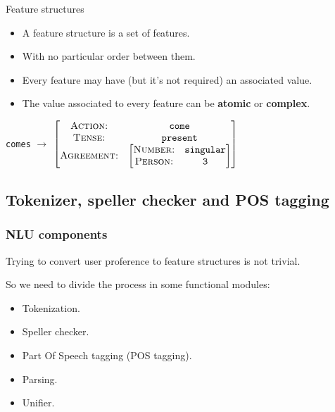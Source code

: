 \documentclass[11pt]{beamer}
\begin{document}
\begin{frame}
	\begin{block}{Feature structures}
	\begin{itemize}
		\item A feature structure is a set of features.
		\item With no particular order between them.
		\item Every feature may have (but it's not required) an associated value.
		\item The value associated to every feature can be \textbf{atomic} or \textbf{complex}.
	\end{itemize}
	\end{block}
	\vspace{10pt}
	\pause
	\begin{center}
		\texttt{comes} \small $\longrightarrow$ 
				$\begin{bmatrix}
						\textsc{Action:}      & \texttt{come}\\ 
						\textsc{Tense:}     	& \texttt{present}\\ 
						\textsc{Agreement:}   & \begin{bmatrix}
																			\textsc{Number:} & \texttt{singular}\\ 
																			\textsc{Person:} & \texttt{3}\\ 
																		\end{bmatrix}
				\end{bmatrix}$
			\end{center}
\end{frame}

\subsection{Tokenizer, speller checker and POS tagging}

\begin{frame}
	\frametitle{NLU components}
	Trying to convert user proference to feature structures is not trivial. \par
	So we need to divide the process in some functional modules:
	\pause
	\vspace{10pt}
	\begin{itemize}
		\item Tokenization.
		\item Speller checker.
		\item Part Of Speech tagging (POS tagging).
		\item Parsing.
		\item Unifier.
	\end{itemize}
\end{frame}
\end{document}
